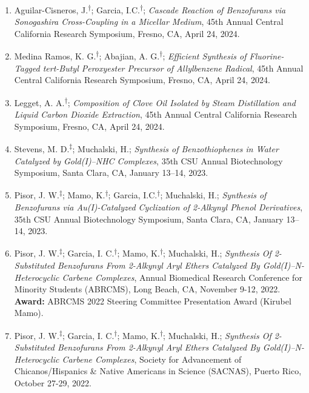 \documentclass[11pt,letterpaper]{article}
\begin{document}
\begin{enumerate}[itemindent=0pt]
    \item{Aguilar-Cisneros, J.\textsuperscript{$\dagger$}; Garcia, I.C.\textsuperscript{$\dagger$}; \emph{Cascade Reaction of Benzofurans via Sonogashira Cross-Coupling in a Micellar Medium}, 45th Annual Central California Research Symposium, Fresno, CA, April 24, 2024.}
  
    \item{Medina Ramos, K. G.\textsuperscript{$\dagger$}; Abajian, A. G.\textsuperscript{$\dagger$}; \emph{Efficient Synthesis of Fluorine-Tagged tert-Butyl Peroxyester Precursor of Allylbenzene Radical}, 45th Annual Central California Research Symposium, Fresno, CA, April 24, 2024.}
    
    \item{Legget, A. A.\textsuperscript{$\dagger$}; \emph{Composition of Clove Oil Isolated by Steam Distillation and Liquid Carbon Dioxide Extraction}, 45th Annual Central California Research Symposium, Fresno, CA, April 24, 2024.}

    \item{Stevens, M. D.\textsuperscript{$\ddagger$}; Muchalski, H.; \emph{Synthesis of Benzothiophenes in Water Catalyzed by Gold(I)--NHC Complexes}, 35th CSU Annual Biotechnology Symposium, Santa Clara, CA, January 13--14, 2023.}

    \item{Pisor, J. W.\textsuperscript{$\ddagger$}; Mamo, K.\textsuperscript{$\dagger$}; Garcia, I.C.\textsuperscript{$\dagger$}; Muchalski, H.; \emph{Synthesis of Benzofurans via Au(I)-Catalyzed Cyclization of 2-Alkynyl Phenol Derivatives}, 35th CSU Annual Biotechnology Symposium, Santa Clara, CA, January 13--14, 2023.}

    \item{Pisor, J. W.\textsuperscript{$\ddagger$}; Garcia, I. C.\textsuperscript{$\dagger$}; Mamo, K.\textsuperscript{$\dagger$}; Muchalski, H.; \emph{Synthesis Of 2-Substituted Benzofurans From 2-Alkynyl Aryl Ethers Catalyzed By Gold(I)--N-Heterocyclic Carbene Complexes}, Annual Biomedical Research Conference for Minority Students (ABRCMS), Long Beach, CA, November 9-12, 2022.}\newline
    \textbf{Award:} ABRCMS 2022 Steering Committee Presentation Award (Kirubel Mamo).

    \item{Pisor, J. W.\textsuperscript{$\ddagger$}; Garcia, I. C.\textsuperscript{$\dagger$}; Mamo, K.\textsuperscript{$\dagger$}; Muchalski, H.; \emph{Synthesis Of 2-Substituted Benzofurans From 2-Alkynyl Aryl Ethers Catalyzed By Gold(I)--N-Heterocyclic Carbene Complexes}, Society for Advancement of Chicanos/Hispanics \& Native Americans in Science (SACNAS), Puerto Rico, October 27-29, 2022.}


\end{enumerate}
\end{document}
